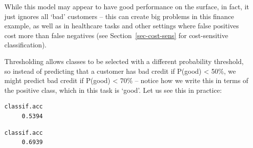 While this model may appear to have good performance on the surface, in
fact, it just ignores all `bad' customers -- this can create big
problems in this finance example, as well as in healthcare tasks and
other settings where false positives cost more
than false negatives (see
Section~\ref{sec-cost-sens} for cost-sensitive classification).

Thresholding allows classes to be selected with a different probability
threshold, so instead of predicting that a customer has bad credit if
P(good) \textless{} 50\%, we might predict bad credit if P(good)
\textless{} 70\% -- notice how we write this in terms of the positive
class, which in this task is `good'. Let us see this in practice:

\begin{Shaded}
\begin{Highlighting}[]
\SpecialCharTok{$}\NormalTok{(}\NormalTok{)}
\SpecialCharTok{$}\NormalTok{(}\NormalTok{(}\NormalTok{))}
\end{Highlighting}
\end{Shaded}

\begin{verbatim}
classif.acc 
     0.5394 
\end{verbatim}

\begin{Shaded}
\begin{Highlighting}[]
\OtherTok{=} \NormalTok{(}\NormalTok{, } \NormalTok{)}
\SpecialCharTok{$}\SpecialCharTok{$}
\OtherTok{=}\SpecialCharTok{$}\SpecialCharTok{$}
\SpecialCharTok{$}\NormalTok{(}\NormalTok{(}\NormalTok{))}
\end{Highlighting}
\end{Shaded}

\begin{verbatim}
classif.acc 
     0.6939 
\end{verbatim}

\begin{Shaded}
\begin{Highlighting}[]
\SpecialCharTok{$}
\end{Highlighting}
\end{Shaded}

